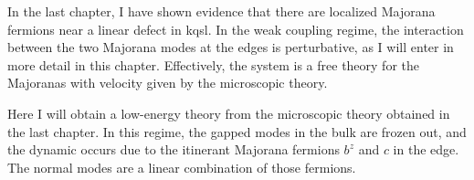\label{ch:5}

In the last chapter, I have shown evidence that there are localized Majorana fermions near a linear defect in \acrshort{kqsl}. In the weak coupling regime, the interaction between the two Majorana modes at the edges is perturbative, as I will enter in more detail in this chapter. Effectively, the system is a free theory for the Majoranas with velocity given by the microscopic theory.

Here I will obtain a low-energy theory from the microscopic theory obtained in the last chapter. In this regime, the gapped modes in the bulk are frozen out, and the dynamic occurs due to the itinerant Majorana fermions $b^{z}$ and $c$ in the edge. The normal modes are a linear combination of those fermions.

        \begin{comment}
        \textcolor{red!40!black}{
        \begin{itemize}
            \item Find the exact eigen-vector and eigen-energy up to linear order in momentum (also show they are localized near the edges); 
            \item the low energy are described the a Majorana mode that is the zero-energy elementary excitation of the Hamiltonian. This operator can be written as a linear combination of the $b^{z}$ and $c$ in the edge. The hamiltonian can be written in terms of this operator $\gamma_R$ and $\gamma_L$;
            \item then write the spin operator in this effective theory in terms of $\gamma$'s. 
        \end{itemize}
        The chapter is important to summarize of the last two chapter in a simple effective theory for the chiral Majorana fermions with known parameters of the microscopic theory.
        }
        \end{comment}


